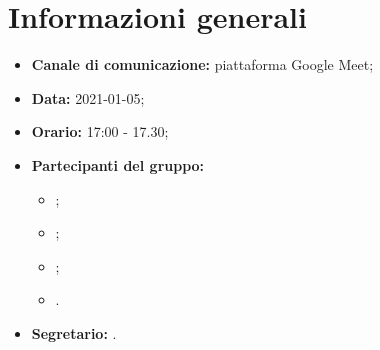 \section{Informazioni generali}
\begin{itemize}
\item \textbf{Canale di comunicazione:} piattaforma Google Meet;
\item \textbf{Data:} 2021-01-05;
\item \textbf{Orario:} 17:00 - 17.30;
\item \textbf{Partecipanti del gruppo:}
	\begin{itemize}
	\item \MDI ;
	\item \MB ;
	\item \GB ;
	\item \VAS .
	\end{itemize}
\item \textbf{Segretario:} \MB .

\end{itemize}